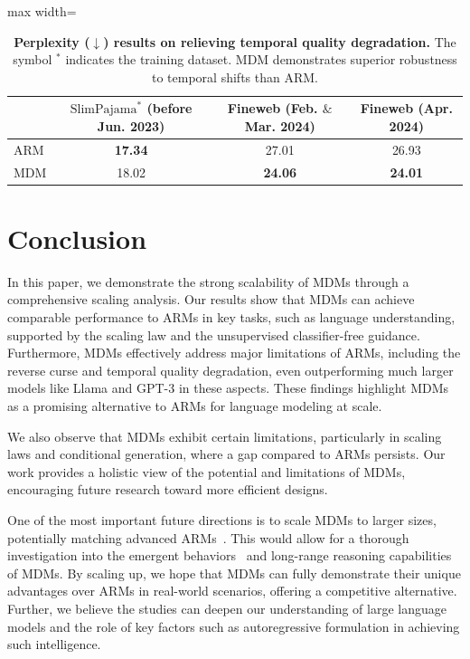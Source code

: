 \documentclass{article} %
\begin{document}
\begin{table}[t!]
    \centering
    \caption{\textbf{Perplexity ($\downarrow$) results on relieving temporal quality degradation.} The symbol $^*$ indicates the training dataset. MDM demonstrates superior robustness to temporal shifts than ARM.}
    \label{tab:temporal_degradation}
    \begin{adjustbox}{max width=\textwidth}
    \begin{tabular}{lccc}
      \toprule
          & $\text{SlimPajama}^*$ (before Jun. 2023) & Fineweb (Feb. $\&$ Mar. 2024) & Fineweb (Apr. 2024) \\
        \midrule
        ARM & \textbf{17.34} & 27.01 & 26.93 \\
        \midrule
        MDM & 18.02 & \textbf{24.06} & \textbf{24.01} \\
      \bottomrule
    \end{tabular}
    \end{adjustbox}
\end{table}



\section{Conclusion}

In this paper, we demonstrate the strong scalability of MDMs through a comprehensive scaling analysis. Our results show that MDMs can achieve comparable performance to ARMs in key tasks, such as language understanding, supported by the scaling law and the unsupervised classifier-free guidance. Furthermore, MDMs effectively address major limitations of ARMs, including the reverse curse and temporal quality degradation, even outperforming much larger models like Llama and GPT-3 in these aspects. These findings highlight MDMs as a promising alternative to ARMs for language modeling at scale.

We also observe that MDMs exhibit certain limitations, particularly in scaling laws and conditional generation, where a gap compared to ARMs persists. Our work provides a holistic view of the potential and limitations of MDMs, encouraging future research toward more efficient designs.

One of the most important future directions is to scale MDMs to larger sizes, potentially matching advanced ARMs~\citep{achiam2023gpt,dubey2024llama}. This would allow for a thorough investigation into the emergent behaviors~\citep{wei2022emergent} and long-range reasoning capabilities~\citep{wei2022chain} of MDMs. By scaling up, we hope that MDMs can fully demonstrate their unique advantages over ARMs in real-world scenarios, offering a competitive alternative. Further, we believe the studies can deepen our understanding of large language models and the role of key factors such as autoregressive formulation in achieving such intelligence.
\end{document}
